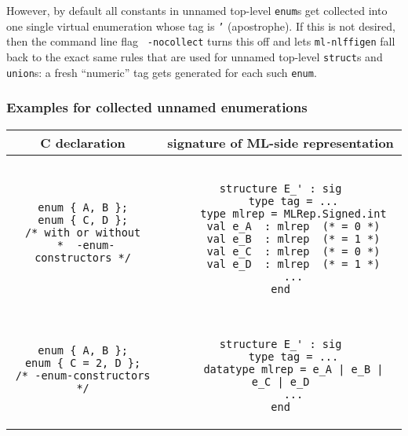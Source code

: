 \documentclass[titlepage,letterpaper]{article}
\newcommand{\gentool}{{\tt ml-nlffigen}}
\begin{document}
However, by default all constants in unnamed top-level {\tt enum}s get
collected into one single virtual enumeration whose tag is {\tt '}
(apostrophe).  If this is not desired, then the command line flag {\tt
  -nocollect} turns this off and lets {\gentool} fall back to the
exact same rules that are used for unnamed top-level {\tt struct}s and
{\tt union}s: a fresh ``numeric'' tag gets generated for each such
{\tt enum}.

\subsubsection*{Examples for collected unnamed enumerations}

\begin{small}
\begin{center}
\begin{tabular}{c|c}
C declaration & signature of ML-side representation \\ \hline\hline
\begin{minipage}{2in}
\begin{verbatim}
enum { A, B };
enum { C, D };
/* with or without
 *  -enum-constructors */
\end{verbatim}
\end{minipage}
&
\begin{minipage}{4in}
\begin{verbatim}

structure E_' : sig
    type tag = ...
    type mlrep = MLRep.Signed.int
    val e_A  : mlrep  (* = 0 *)
    val e_B  : mlrep  (* = 1 *)
    val e_C  : mlrep  (* = 0 *)
    val e_D  : mlrep  (* = 1 *)
    ...
end

\end{verbatim}
\end{minipage}
\\ \hline
\begin{minipage}{2in}
\begin{verbatim}
enum { A, B };
enum { C = 2, D };
/* -enum-constructors */
\end{verbatim}
\end{minipage}
&
\begin{minipage}{4in}
\begin{verbatim}

structure E_' : sig
    type tag = ...
    datatype mlrep = e_A | e_B | e_C | e_D
    ...
end

\end{verbatim}
\end{minipage}
\end{tabular}
\end{center}
\end{small}

%


\end{document}
